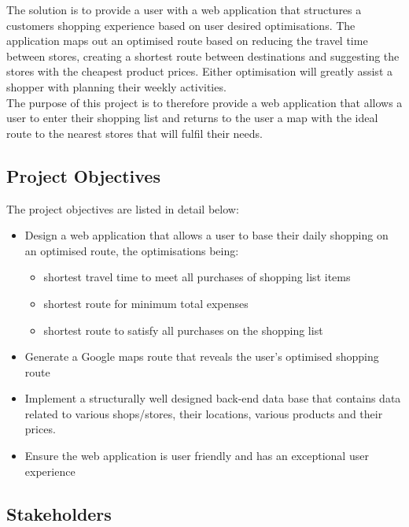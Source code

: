 \documentclass[10pt, a4paper, twocolumn]{scrartcl}
\begin{document}
		The solution is to provide a user with a web application that structures a customers shopping experience based on user desired optimisations. The application maps out an optimised route based on reducing the travel time between stores, creating a shortest route between destinations and suggesting the stores with the cheapest product prices. Either optimisation will greatly assist a shopper with planning their weekly activities. \\
		
		The purpose of this project is to therefore provide a web application that allows a user to enter their shopping list and returns to the user a map with the ideal route to the nearest stores that will fulfil their needs. 
	
	\subsection{Project Objectives}
	
		The project objectives are listed in detail below:
		
			\begin{itemize}[noitemsep]
				\item Design a web application that allows a user to base their daily shopping on an optimised route, the optimisations being:
					\begin{itemize}
						\item shortest travel time to meet all purchases of shopping list items 
						\item shortest route for minimum total expenses
						\item shortest route to satisfy all purchases on the shopping list 
					\end{itemize}
				\item Generate a Google maps route that reveals the user's optimised shopping route
				\item Implement a structurally well designed back-end data base that contains data related to various shops/stores, their locations, various products and their prices.
				\item Ensure the web application is user friendly and has an exceptional user experience
			\end{itemize}
	
	\subsection{Stakeholders}
		
\end{document}
